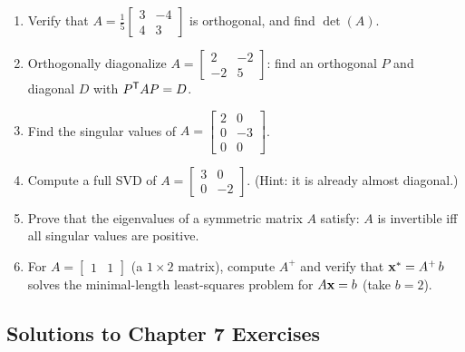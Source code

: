 \begin{enumerate}[label=\textbf{7.\arabic*},leftmargin=2.6em,itemsep=6pt]
\item Verify that $A=\tfrac15\left[\begin{smallmatrix}3&-4\\4&3\end{smallmatrix}\right]$ is orthogonal, and find $\det(A)$.

\item Orthogonally diagonalize $A=\left[\begin{smallmatrix}2&-2\\-2&5\end{smallmatrix}\right]$: find an orthogonal $P$ and diagonal $D$ with $P^{\mathsf{T}} AP=D$.

\item Find the singular values of $A=\left[\begin{smallmatrix}2&0\\0&-3\\0&0\end{smallmatrix}\right]$.

\item Compute a full SVD of $A=\left[\begin{smallmatrix}3&0\\0&-2\end{smallmatrix}\right]$. (Hint: it is already almost diagonal.)

\item Prove that the eigenvalues of a symmetric matrix $A$ satisfy: $A$ is invertible iff all singular values are positive.

\item For $A=\left[\begin{smallmatrix}1&1\end{smallmatrix}\right]$ (a $1\times2$ matrix), compute $A^+$ and verify that $\mathbf{x}^*=A^+\,b$ solves the minimal-length least-squares problem for $A\mathbf{x}=b$ (take $b=2$).
\end{enumerate}

\subsection*{Solutions to Chapter 7 Exercises}

